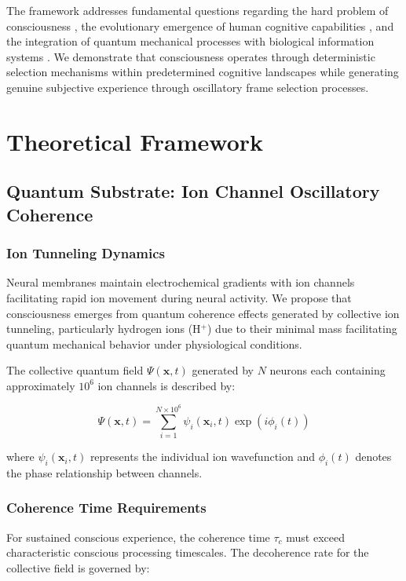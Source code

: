 \documentclass[12pt,a4paper]{article}
\begin{document}
The framework addresses fundamental questions regarding the hard problem of consciousness \citep{chalmers1995facing}, the evolutionary emergence of human cognitive capabilities \citep{wrangham2009catching}, and the integration of quantum mechanical processes with biological information systems \citep{hameroff2014consciousness}. We demonstrate that consciousness operates through deterministic selection mechanisms within predetermined cognitive landscapes while generating genuine subjective experience through oscillatory frame selection processes.

\section{Theoretical Framework}

\subsection{Quantum Substrate: Ion Channel Oscillatory Coherence}

\subsubsection{Ion Tunneling Dynamics}

Neural membranes maintain electrochemical gradients with ion channels facilitating rapid ion movement during neural activity. We propose that consciousness emerges from quantum coherence effects generated by collective ion tunneling, particularly hydrogen ions (H$^+$) due to their minimal mass facilitating quantum mechanical behavior under physiological conditions.

The collective quantum field $\Psi(\mathbf{x},t)$ generated by $N$ neurons each containing approximately $10^6$ ion channels is described by:

\begin{equation}
\Psi(\mathbf{x},t) = \sum_{i=1}^{N \times 10^6} \psi_i(\mathbf{x}_i,t) \exp(i\phi_i(t))
\end{equation}

where $\psi_i(\mathbf{x}_i,t)$ represents the individual ion wavefunction and $\phi_i(t)$ denotes the phase relationship between channels.

\subsubsection{Coherence Time Requirements}

For sustained conscious experience, the coherence time $\tau_c$ must exceed characteristic conscious processing timescales. The decoherence rate for the collective field is governed by:
\end{document}
